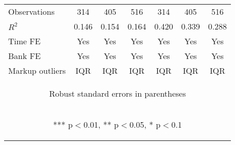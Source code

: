 \documentclass[]{article}
\begin{document}
\begin{center}
\begin{tabular}{lcccccc}
Observations & 314 & 405 & 516 & 314 & 405 & 516 \\
$R^2$ & 0.146 & 0.154 & 0.164 & 0.420 & 0.339 & 0.288 \\
Time FE & Yes & Yes & Yes & Yes & Yes & Yes \\
Bank FE & Yes & Yes & Yes & Yes & Yes & Yes \\
 Markup outliers & IQR & IQR & IQR & IQR & IQR & IQR \\ \hline
\multicolumn{7}{c}{\begin{footnotesize} Robust standard errors in parentheses\end{footnotesize}} \\
\multicolumn{7}{c}{\begin{footnotesize} *** p$<$0.01, ** p$<$0.05, * p$<$0.1\end{footnotesize}} \\
\end{tabular}
\end{center}
\end{document}
